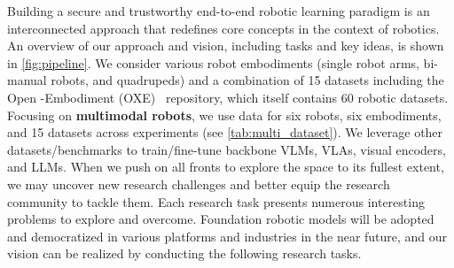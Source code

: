{%
Building a secure and trustworthy end-to-end robotic learning paradigm is an interconnected approach that redefines core concepts in the context of robotics. An overview of our approach and vision, including tasks and key ideas, is shown in \autoref{fig:pipeline}. 
We consider various robot embodiments (\eg single robot arms, bi-manual robots, and quadrupeds) and a combination of 15 datasets including the Open {\xo}-Embodiment (OXE)~\cite{9} repository, which itself contains 60 robotic datasets.
Focusing on \textbf{multimodal robots}, we use data for {six robots, six embodiments, and 15 datasets} across experiments (see \autoref{tab:multi_dataset}).
We leverage other datasets/benchmarks to train/fine-tune backbone VLMs, VLAs, visual encoders, and LLMs.
When we push on all fronts to explore the space to its fullest extent, we may uncover new research challenges and better equip the research community to tackle them. Each research task presents numerous interesting problems to explore and overcome. 
Foundation robotic models will be adopted and democratized in various platforms and industries in the near future, and our vision can be realized by conducting the following research tasks.











}
